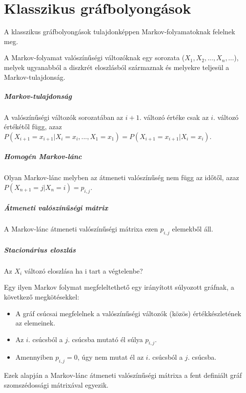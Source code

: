 \chapter{Klasszikus gráfbolyongások}

A klasszikus gráfbolyongások tulajdonképpen Markov-folyamatoknak felelnek meg.

A Markov-folyamat valószínűségi változóknak egy sorozata ($X_1, X_2, ..., X_n, ...$),
melyek ugyanabból a diszkrét eloszlásból származnak és melyekre teljesül a
Markov-tulajdonság.

\paragraph{Markov-tulajdonság} A valószínűségi változók sorozatában
az $i+1.$ változó értéke csak az $i.$ változó értékétől függ, azaz
$P(X_{i+1} = x_{i+1} | X_i = x_i, ..., X_1 = x_1) = P(X_{i+1} = x_{i+1} | X_i = x_i)$.

\paragraph{Homogén Markov-lánc} Olyan Markov-lánc melyben az átmeneti
valószínűség nem függ az időtől, azaz $P(X_{n+1} = j | X_n = i) = p_{i,j}$.

\paragraph{Átmeneti valószínűségi mátrix}
A Markov-lánc átmeneti valószínűségi mátrixa ezen $p_{i,j}$ elemekből áll.

\paragraph{Stacionárius eloszlás} Az $X_i$ változó eloszlása ha i tart
a végtelenbe?

Egy ilyen Markov folymat megfeleltethető egy irányított súlyozott gráfnak, a következő megkötésekkel:
\begin{itemize}
  \item A gráf csúcsai megfelelnek a valószínűségi változók (közös) értékkészletének az elemeinek.
  \item Az $i.$ csúcsból a $j.$ csúcsba mutató él súlya $p_{i,j}$.
  \item Amennyiben $p_{i,j}=0$, úgy nem mutat él az $i.$ csúcsból a $j.$ csúcsba.
\end{itemize}

Ezek alapján a Markov-lánc átmeneti valószínűségi mátrixa a fent definiált gráf
szomszédossági mátrixával egyezik.

